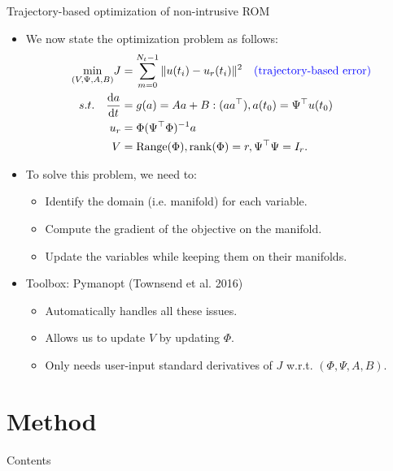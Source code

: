 \documentclass[presentation]{beamer}
\begin{document}
\begin{frame}[label={sec:org11b1ef6}]{Trajectory-based optimization of non-intrusive ROM}
\begin{itemize}[<+->]
\item We now state the optimization problem as follows:
\begin{subequations}
\label{eq:5}
\begin{align}
  \underset{(V, \Psi, A, B)}{\min} J &= \sum_{m = 0}^{N_{t} - 1}\|u(t_{i}) - u_{r}(t_{i})\|^{2} \quad \text{\textcolor{blue}{(trajectory-based error)}}\\
  s.t. \quad \frac{\mathrm{d}a}{\mathrm{d}t} &= g(a) = Aa + B:(aa^{\top}), a(t_{0}) = \Psi^{\top}u(t_{0})\\
  u_{r} &= \Phi(\Psi^{\top}\Phi)^{-1}a\\
  V &= \mathrm{Range}(\Phi), \mathrm{rank}(\Phi) = r, \Psi^{\top}\Psi = I_{r}.
\end{align}
\end{subequations}
\item To solve this problem, we need to:
\begin{itemize}
\item Identify the domain (i.e. manifold) for each variable.
\item Compute the gradient of the objective on the manifold.
\item Update the variables while keeping them on their manifolds.
\end{itemize}

\item Toolbox: Pymanopt (Townsend et al. 2016)
\begin{itemize}
\item Automatically handles all these issues.
\item Allows us to update \(V\) by updating \(\Phi\).
\item Only needs user-input standard derivatives of \(J\) w.r.t. \((\Phi, \Psi, A, B)\).
\end{itemize}
\end{itemize}
\end{frame}

\section{Method}
\label{sec:orgb47c69a}
\begin{frame}{Contents}
\end{frame}
\end{document}
